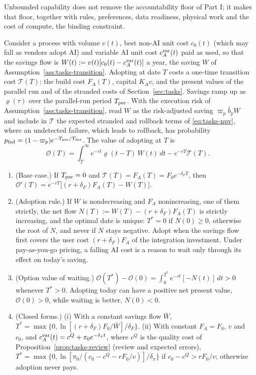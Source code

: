Unbounded capability does not remove the accountability floor of Part I; it makes that floor, together with rules, preferences, data readiness, physical work and the cost of compute, the binding constraint.

\begin{proposition}\label{prop:ext-timing}
Consider a process with volume $v(t)$, best non-AI unit cost $c_0(t)$ (which may fall as vendors adopt AI) and variable AI unit cost $c^{\rm var}_A(t)$ paid as used, so that the savings flow is $W(t):=v(t)[c_0(t)-c^{\rm var}_A(t)]$ a year, the saving $W$ of Assumption~\ref{ass:tasks-transition}. Adopting at date $T$ costs a one-time transition cost $\mathcal T(T)$: the build cost $F_A(T)$, capital $K_Av$, and the present values of the parallel run and of the stranded costs of Section~\ref{sec:tasks}. Savings ramp up as $\varrho(\tau)$ over the parallel-run period $T_{\rm par}$. With the execution risk of Assumption~\ref{ass:tasks-transition}, read $W$ as the risk-adjusted saving $\varpi_p\bar b_pW$ and include in $\mathcal T$ the expected stranded and rollback terms of \eqref{eq:tasks-npv}, where an undetected failure, which leads to rollback, has probability $p_{\rm fail}=(1-\varpi_p)e^{-T_{\rm par}/T_{\rm det}}$. The value of adopting at $T$ is
\begin{equation}\label{eq:ext-OT}
\mathcal O(T)=\int_T^\infty e^{-rt}\varrho(t-T)\,W(t)\,dt-e^{-rT}\mathcal T(T).
\end{equation}
\begin{enumerate}
\item[(a)] (Base case.) If $T_{\rm par}=0$ and $\mathcal T(T)=F_A(T)=F_0e^{-\delta_FT}$, then $\mathcal O'(T)=e^{-rT}\bigl[(r+\delta_F)F_A(T)-W(T)\bigr]$.
\item[(b)] (Adoption rule.) If $W$ is nondecreasing and $F_A$ nonincreasing, one of them strictly, the net flow $N(T):=W(T)-(r+\delta_F)F_A(T)$ is strictly increasing, and the optimal date is unique: $T^*=0$ if $N(0)\ge0$, otherwise the root of $N$, and never if $N$ stays negative. Adopt when the savings flow first covers the user cost $(r+\delta_F)F_A$ of the integration investment. Under pay-as-you-go pricing, a falling AI cost is a reason to wait only through its effect on today's saving.
\item[(c)] (Option value of waiting.) $\mathcal O(T^*)-\mathcal O(0)=\int_0^{T^*}e^{-rt}[-N(t)]\,dt>0$ whenever $T^*>0$. Adopting today can have a positive net present value, $\mathcal O(0)>0$, while waiting is better, $N(0)<0$.
\item[(d)] (Closed forms.) (i) With a constant savings flow $\bar W$, $T^*=\max\{0,\ln[(r+\delta_F)F_0/\bar W]/\delta_F\}$. (ii) With constant $F_A=F_0$, $v$ and $c_0$, and $c^{\rm var}_A(t)=c^Q+\pi_0e^{-\delta_\pi t}$, where $c^Q$ is the quality cost of Proposition~\ref{prop:tasks-review} (review and expected errors), $T^*=\max\{0,\ln[\pi_0/(c_0-c^Q-rF_0/v)]/\delta_\pi\}$ if $c_0-c^Q>rF_0/v$; otherwise adoption never pays.

\end{enumerate}
\end{proposition}
